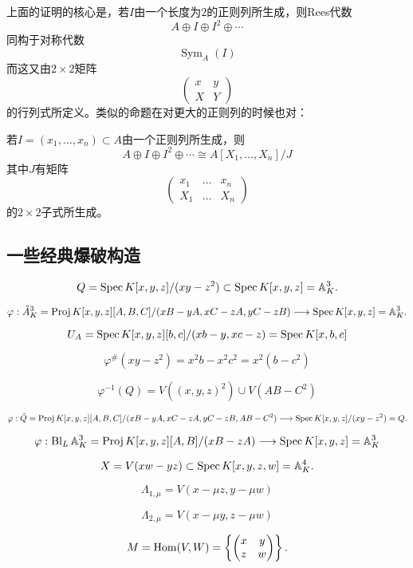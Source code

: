 
上面的证明的核心是，若$I$由一个长度为$2$的正则列所生成，则Rees代数
\[
	A\oplus I \oplus I^2\oplus \cdots
\]
同构于对称代数
\[
	\operatorname{Sym}_A(I)
\]
而这又由$2\times 2$矩阵
\[
	\begin{pmatrix}
		x&y\\
		X&Y
	\end{pmatrix}
\]
的行列式所定义。类似的命题在对更大的正则列的时候也对：

\begin{exe}\label{exe:4.26}
	若$I=(x_1,\dots,x_n)\subset A$由一个正则列所生成，则
\[
	A\oplus I \oplus I^2\oplus \cdots\cong A[X_1,\dots,X_n]/J
\]
其中$J$有矩阵
\[
	\begin{pmatrix}
		x_1&\dots&x_n\\
		X_1&\dots&X_n
	\end{pmatrix}
\]
的$2\times 2$子式所生成。
\end{exe}

\subsection{一些经典爆破构造}\label{s:4.2.2}

\[
	Q=\operatorname{Spec} K[x,y,z]/(xy-z^2)\subset \operatorname{Spec} K[x,y,z]=\mathbb A_K^3.
\]

\[
	\varphi:\tilde A_K^3=\operatorname{Proj} K[x,y,z][A,B,C]/(xB-yA,xC-zA,yC-zB)\longrightarrow \operatorname{Spec} K[x,y,z]=\mathbb A_K^3.
\]

\[
	U_A=\operatorname{Spec} K[x,y,z][b,c]/(xb-y,xc-z)=\operatorname{Spec} K[x,b,c]
\]

\[
	\varphi^\# (xy-z^2)=x^2b-x^2c^2=x^2(b-c^2)
\]

\[
	\varphi^{-1}(Q)=V((x,y,z)^2)\cup V(AB-C^2)
\]

\[
	\varphi:\tilde Q=\operatorname{Proj} K[x,y,z][A,B,C]/(xB-yA,xC-zA,yC-zB,AB-C^2)\longrightarrow \operatorname{Spec} K[x,y,z]/(xy-z^2)=Q.
\]


\[
	\varphi:\operatorname{Bl}_L \mathbb A_K^3=\operatorname{Proj} K[x,y,z][A,B]/(xB-zA)\longrightarrow \operatorname{Spec} K[x,y,z]=\mathbb A_K^3
\]

\[
	X=V(xw-yz)\subset \operatorname{Spec} K[x,y,z,w]=\mathbb A_K^4.
\]

\[
\Lambda_{1,\mu}=V(x-\mu z,y-\mu w)
\]

\[
\Lambda_{2,\mu}=V(x-\mu y,z-\mu w)
\]


\[
	M=\operatorname{Hom}(V,W)=\left\{\begin{pmatrix}x&y\\z&w\end{pmatrix}\right\}.
\]

